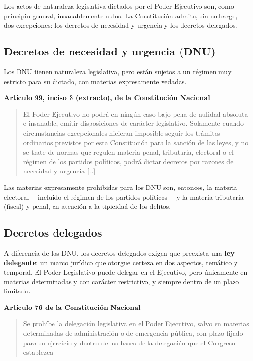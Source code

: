 \documentclass[12pt,oneside]{book}
\newenvironment{normacitada}[1]{%
    \medskip
    \noindent\textbf{#1}\par\smallskip
    \begin{quote}\itshape
}{%
    \end{quote}
    \medskip
}
\begin{document}
Los actos de naturaleza legislativa dictados por el Poder Ejecutivo son, como principio general, insanablemente nulos. La Constitución admite, sin embargo, dos excepciones: los decretos de necesidad y urgencia y los decretos delegados.

\subsection{Decretos de necesidad y urgencia (DNU)}

Los DNU tienen naturaleza legislativa, pero están sujetos a un régimen muy estricto para su dictado, con materias expresamente vedadas.

\begin{normacitada}{Artículo 99, inciso 3 (extracto), de la Constitución Nacional}
El Poder Ejecutivo no podrá en ningún caso bajo pena de nulidad absoluta e insanable, emitir disposiciones de carácter legislativo. Solamente cuando circunstancias excepcionales hicieran imposible seguir los trámites ordinarios previstos por esta Constitución para la sanción de las leyes, y no se trate de normas que regulen materia penal, tributaria, electoral o el régimen de los partidos políticos, podrá dictar decretos por razones de necesidad y urgencia [\ldots]
\end{normacitada}

Las materias expresamente prohibidas para los DNU son, entonces, la materia electoral —incluido el régimen de los partidos políticos— y la materia tributaria (fiscal) y penal, en atención a la tipicidad de los delitos.

\subsection{Decretos delegados}

A diferencia de los DNU, los decretos delegados exigen que preexista una \textbf{ley delegante}: un marco jurídico que otorgue certeza en dos aspectos, temático y temporal. El Poder Legislativo puede delegar en el Ejecutivo, pero únicamente en materias determinadas y con carácter restrictivo, y siempre dentro de un plazo limitado.

\begin{normacitada}{Artículo 76 de la Constitución Nacional}
Se prohíbe la delegación legislativa en el Poder Ejecutivo, salvo en materias determinadas de administración o de emergencia pública, con plazo fijado para su ejercicio y dentro de las bases de la delegación que el Congreso establezca.
\end{normacitada}
\end{document}
